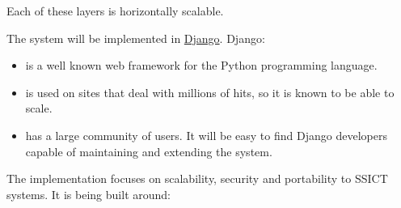\documentclass[12pt,a4paper,twosided]{article}
\begin{document}
Each of these layers is horizontally scalable.

The system will be implemented in \href{http://django.org}{Django}.
Django:

\begin{itemize}
\itemsep1pt\parskip0pt
\item
  is a well known web framework for the Python programming language.
\item
  is used on sites that deal with millions of hits, so it is known to be
  able to scale.
\item
  has a large community of users. It will be easy to find Django
  developers capable of maintaining and extending the system.
\end{itemize}

The implementation focuses on scalability, security and portability to
SSICT systems. It is being built around:
\end{document}
